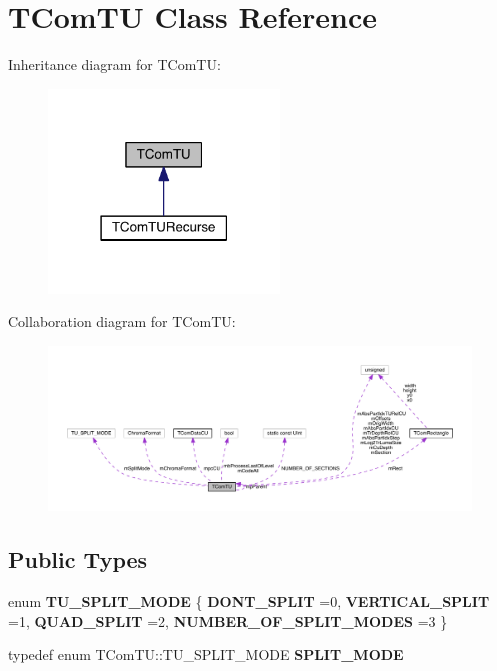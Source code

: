 \hypertarget{class_t_com_t_u}{}\section{T\+Com\+TU Class Reference}
\label{class_t_com_t_u}


Inheritance diagram for T\+Com\+TU\+:
\nopagebreak
\begin{figure}[H]
\begin{center}
\leavevmode
\includegraphics[width=174pt]{dc/d9f/class_t_com_t_u__inherit__graph}
\end{center}
\end{figure}


Collaboration diagram for T\+Com\+TU\+:
\nopagebreak
\begin{figure}[H]
\begin{center}
\leavevmode
\includegraphics[width=350pt]{dd/d61/class_t_com_t_u__coll__graph}
\end{center}
\end{figure}
\subsection*{Public Types}
\begin{DoxyCompactItemize}
\item 
\mbox{\label{class_t_com_t_u_a742584c90862540f10ba6bc09fb78f2e}} 
enum {\bfseries T\+U\+\_\+\+S\+P\+L\+I\+T\+\_\+\+M\+O\+DE} \{ {\bfseries D\+O\+N\+T\+\_\+\+S\+P\+L\+IT} =0, 
{\bfseries V\+E\+R\+T\+I\+C\+A\+L\+\_\+\+S\+P\+L\+IT} =1, 
{\bfseries Q\+U\+A\+D\+\_\+\+S\+P\+L\+IT} =2, 
{\bfseries N\+U\+M\+B\+E\+R\+\_\+\+O\+F\+\_\+\+S\+P\+L\+I\+T\+\_\+\+M\+O\+D\+ES} =3
 \}
\item 
\mbox{\label{class_t_com_t_u_a547fec34d2bc14b381e62de4080ac033}} 
typedef enum T\+Com\+T\+U\+::\+T\+U\+\_\+\+S\+P\+L\+I\+T\+\_\+\+M\+O\+DE {\bfseries S\+P\+L\+I\+T\+\_\+\+M\+O\+DE}
\end{DoxyCompactItemize}
